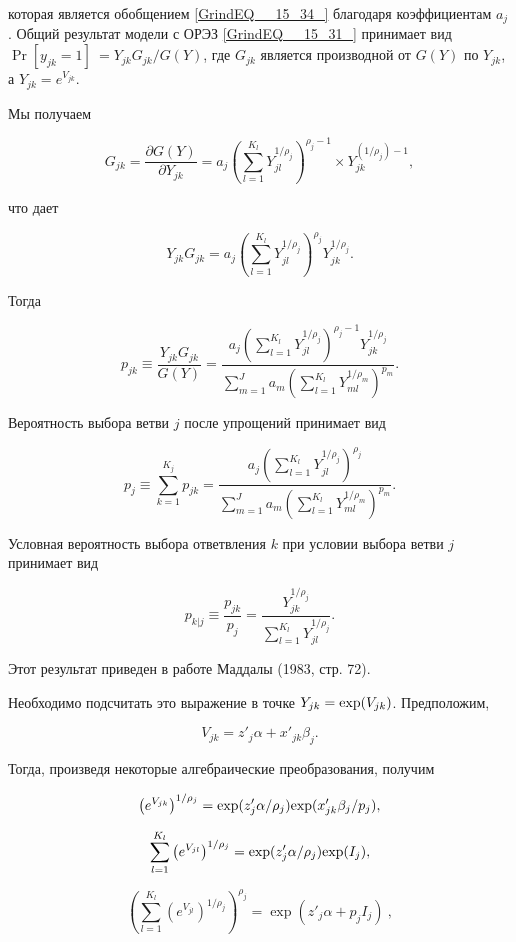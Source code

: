 которая является обобщением \eqref{GrindEQ__15_34_} благодаря коэффициентам $a_j$. Общий результат модели с ОРЭЗ \eqref{GrindEQ__15_31_} принимает вид ${\Pr  \left[y_{jk}=1\right]\ }={Y_{jk}G_{jk}}/{G(Y)}$, где $G_{jk}$ является производной от $G(Y)$ по $Y_{jk}$, а $Y_{jk}=e^{V_{jk}}$.

Мы получаем 

\[G_{jk}=\frac{\partial G\left(Y\right)}{\partial Y_{jk}}={a_j\left(\sum^{K_l}_{l=1}{Y^{{1}/{{\rho }_j}}_{jl}}\right)}^{{\rho }_j-1}\times Y^{\left({1}/{{\rho }_j}\right)-1}_{jk},\] 

что дает

\[Y_{jk}G_{jk}=a_j{\left(\sum^{K_l}_{l=1}{Y^{{1}/{{\rho }_j}}_{jl}}\right)}^{{\rho }_j}Y^{{1}/{{\rho }_j}}_{jk}.\] 

Тогда 

\[p_{jk}\equiv \frac{Y_{jk}G_{jk}}{G\left(Y\right)}=\frac{a_j{\left(\sum^{K_l}_{l=1}{Y^{{1}/{{\rho }_j}}_{jl}}\right)}^{{\rho }_j-1}Y^{{1}/{{\rho }_j}}_{jk}}{{\sum^J_{m=1}{a_m\left(\sum^{K_l}_{l=1}{Y^{{1}/{{\rho }_m}}_{ml}}\right)}}^{p_m}}.\] 

Вероятность выбора ветви $j$ после упрощений принимает вид

\[p_j\equiv \sum^{K_j}_{k=1}{p_{jk}}=\frac{a_j{\left(\sum^{K_l}_{l=1}{Y^{{1}/{{\rho }_j}}_{jl}}\right)}^{{\rho }_j}}{{\sum^J_{m=1}{a_m\left(\sum^{K_l}_{l=1}{Y^{{1}/{{\rho }_m}}_{ml}}\right)}}^{p_m}}.\] 

Условная вероятность выбора ответвления $k$ при условии выбора ветви $j$ принимает вид

\[p_{k|j}\equiv \frac{p_{jk}}{p_j}=\frac{Y^{{1}/{{\rho }_j}}_{jk}}{\sum^{K_l}_{l=1}{Y^{{1}/{{\rho }_j}}_{jl}}}.\] 

Этот результат приведен в работе Маддалы (1983, стр. 72).

Необходимо подсчитать  это выражение в точке $Y_{jk}={\rm exp}(V_{jk})$. Предположим, 

\[V_{jk}=z'_j\alpha +x'_{jk}{\beta }_j.\] 

Тогда, произведя некоторые алгебраические преобразования, получим

\[{\left(e^{V_{jk}}\right)}^{{1}/{{\rho }_j}}={\rm exp}({z'_j\alpha }/{{\rho }_j}){\rm exp}(x'_{jk}{\beta }_j/p_j),\] 

\[\sum^{K_l}_{l=1}{{\left(e^{V_{jl}}\right)}^{{1}/{{\rho }_j}}}={\rm exp}({z'_j\alpha }/{{\rho }_j}){\rm exp}(I_j),\] 

\[{\left(\sum^{K_l}_{l=1}{{\left(e^{V_{jl}}\right)}^{{1}/{{\rho }_j}}}\right)}^{{\rho }_j}={\exp  \left(z'_j\alpha +p_jI_j\right)\ },\] 

